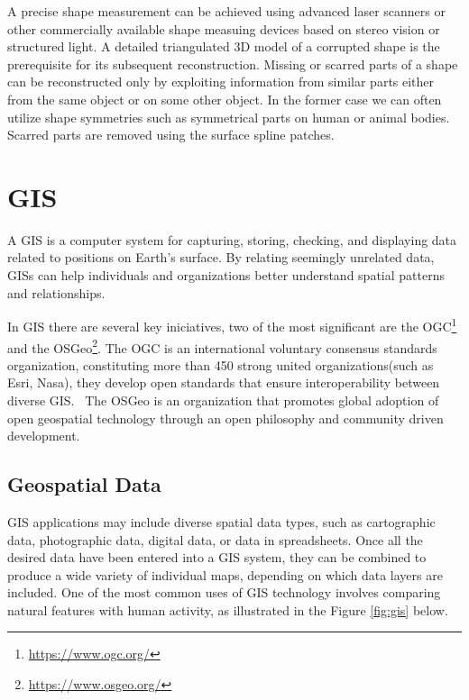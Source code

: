 A precise shape measurement can be achieved using advanced laser scanners or other commercially available shape measuing devices based on stereo 
vision or structured light. A detailed triangulated \gls{3D} model of a corrupted shape is the prerequisite for its subsequent reconstruction. 
Missing or scarred parts of a shape can be reconstructed only by exploiting information from similar parts either from the same
object or on some other object. In the former case we can often utilize shape symmetries such as symmetrical parts on
human or animal bodies. Scarred parts are removed using the surface spline patches.~\cite{7801178}



\section{\gls{GIS}}
\label{sec:geographic_information_system}

A \gls{GIS} is a computer system for capturing, storing, checking, and displaying data related to positions on Earth’s 
surface. By relating seemingly unrelated data, \glspl{GIS} can help individuals and organizations better understand spatial patterns and relationships.
~\cite{natgeo_2024}

In \gls{GIS} there are several key iniciatives, two of the most significant are the \gls{OGC}\footnote{\url{https://www.ogc.org/}} and the \gls{OSGeo}\footnote{\url{https://www.osgeo.org/}}.  
The \gls{OGC} is an international voluntary consensus standards organization, constituting more than 450 strong united organizations(such as Esri, Nasa), they develop open standards that ensure interoperability between diverse \gls{GIS}.~\cite{ogc_who_we_are, ogcapi}
The \gls{OSGeo} is an organization that promotes global adoption of open geospatial technology through an open philosophy and community driven development.~\cite{osgeo_about}

\subsection{Geospatial Data} 
\label{sub:geospatial_data}

\gls{GIS} applications may include diverse spatial data types, such as cartographic data, photographic data, digital data, or data in spreadsheets. Once all the desired data have been entered into a \gls{GIS} system, 
they can be combined to produce a wide variety of individual maps, depending on which data layers are included. 
One of the most common uses of \gls{GIS} technology involves comparing natural features with human activity, as illustrated in the Figure \ref{fig:gis} below. 


